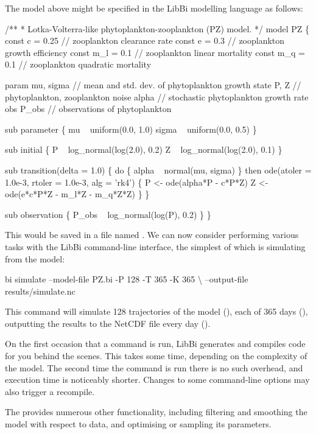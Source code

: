 The model above might be specified in the LibBi modelling language as follows:
\begin{bicode}
/**
 * Lotka-Volterra-like phytoplankton-zooplankton (PZ) model.
 */
model PZ \{
  const c = 0.25   // zooplankton clearance rate
  const e = 0.3    // zooplankton growth efficiency
  const m_l = 0.1  // zooplankton linear mortality
  const m_q = 0.1  // zooplankton quadratic mortality

  param mu, sigma  // mean and std. dev. of phytoplankton growth
  state P, Z       // phytoplankton, zooplankton
  noise alpha      // stochastic phytoplankton growth rate
  obs P_obs        // observations of phytoplankton
  
  sub parameter \{
    mu ~ uniform(0.0, 1.0)
    sigma ~ uniform(0.0, 0.5)
  \}
  
  sub initial \{
    P ~ log_normal(log(2.0), 0.2)
    Z ~ log_normal(log(2.0), 0.1)
  \}

  sub transition(delta = 1.0) \{
    do \{
      alpha ~ normal(mu, sigma)
    \} then ode(atoler = 1.0e-3, rtoler = 1.0e-3, alg = 'rk4') \{
      P <- ode(alpha*P - c*P*Z)
      Z <- ode(e*c*P*Z - m_l*Z - m_q*Z*Z)
    \}
  \}

  sub observation \{
    P_obs ~ log_normal(log(P), 0.2)
  \}
\}
\end{bicode}

This would be saved in a file named . We can now consider
performing various tasks with the LibBi command-line interface, the simplest of
which is simulating from the model:
\begin{cmdcode}
bi simulate --model-file PZ.bi -P 128 -T 365 -K 365 \textbackslash
    --output-file results/simulate.nc
\end{cmdcode}
This command will simulate 128 trajectories of the model (), each
of 365 days (), outputting the results to the NetCDF
file  every day ().

\begin{tip}
On the first occasion that a command is run, LibBi generates and compiles code
for you behind the scenes. This takes some time, depending on the complexity
of the model. The second time the command is run there is no such overhead,
and execution time is noticeably shorter. Changes to some command-line options
may also trigger a recompile.
\end{tip}

The  provides numerous
other functionality, including filtering and smoothing the model with respect
to data, and optimising or sampling its parameters.

